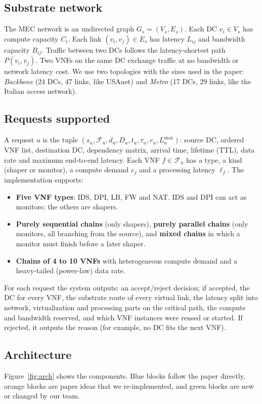 \documentclass[11pt,a4paper]{article}
\begin{document}
\subsection{Substrate network}
The MEC network is an undirected graph $G_s=(V_s,E_s)$. Each DC
$v_i\in V_s$ has compute capacity $C_i$. Each link $(v_i,v_j)\in E_s$ has
latency $L_{ij}$ and bandwidth capacity $B_{ij}$. Traffic between two DCs follows
the latency-shortest path $P(v_i,v_j)$. Two VNFs on the same DC exchange traffic
at no bandwidth or network latency cost. We use two topologies with the sizes
used in the paper: \emph{Backbone} (24 DCs, 47 links, like USAnet) and
\emph{Metro} (17 DCs, 29 links, like the Italian access network).

\subsection{Requests supported}
A request $u$ is the tuple
$(s_u, \mathcal{F}_u, d_u, D_u, t_u, \tau_u, r_u, L^{\max}_u)$: source DC,
ordered VNF list, destination DC, dependency matrix, arrival time, lifetime
(TTL), data rate and maximum end-to-end latency. Each VNF $f\in\mathcal{F}_u$
has a type, a kind (shaper or monitor), a compute demand $c_f$ and a processing
latency $\ell_f$. The implementation supports:
\begin{itemize}
  \item \textbf{Five VNF types}: IDS, DPI, LB, FW and NAT. IDS and DPI can act
  as monitors; the others are shapers.
  \item \textbf{Purely sequential chains} (only shapers), \textbf{purely
  parallel chains} (only monitors, all branching from the source), and
  \textbf{mixed chains} in which a monitor must finish before a later shaper.
  \item \textbf{Chains of 4 to 10 VNFs} with heterogeneous compute demand and a
  heavy-tailed (power-law) data rate.
\end{itemize}

For each request the system outputs: an accept/reject decision; if accepted, the
DC for every VNF, the substrate route of every virtual link, the latency split
into network, virtualization and processing parts on the critical path, the
compute and bandwidth reserved, and which VNF instances were reused or started.
If rejected, it outputs the reason (for example, no DC fits the next VNF).

\subsection{Architecture}
Figure~\ref{fig:arch} shows the components. Blue blocks follow the paper
directly, orange blocks are paper ideas that we re-implemented, and green blocks
are new or changed by our team.
\end{document}

